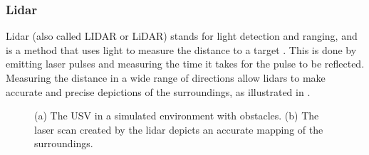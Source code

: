 \subsubsection{Lidar}

Lidar (also called LIDAR or LiDAR) stands for light detection and ranging, and is a method that uses light to measure the distance to a target \citep{wiki:lidar}. This is done by emitting laser pulses and measuring the time it takes for the pulse to be reflected. Measuring the distance in a wide range of directions allow lidars to make accurate and precise depictions of the surroundings, as illustrated in .

\begin{figure}[h!]
    \centering
	\caption[Illustration of a laser scan.]{(a) The USV in a simulated environment with obstacles. (b) The laser scan created by the lidar depicts an accurate mapping of the surroundings.}
	\label{fig:lidar}
\end{figure}

